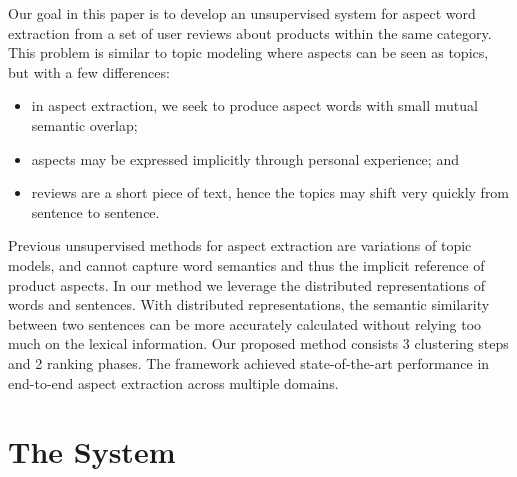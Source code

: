 \documentclass[10pt,final,conference,letterpaper]{IEEEtran}
\newcommand{\secref}[1]{Section \ref{#1}}
\begin{document}
Our goal in this paper is to develop an unsupervised system 
for aspect word extraction from a set of user reviews about products within 
the same category.  This problem is similar to topic modeling where aspects 
can be seen as topics, but with a few differences: 
\begin{itemize}
    \item in aspect extraction, we seek to produce 
	aspect words with small mutual semantic overlap; 
    \item aspects may be expressed implicitly through personal experience; and
    \item reviews are a short piece of text, 
	  hence the topics may shift very quickly from 
          sentence to sentence.
\end{itemize}
Previous unsupervised methods for aspect extraction are 
variations of topic models, and cannot capture word semantics and thus
the implicit reference of product aspects. 
In our method we leverage the distributed 
representations of words and sentences. With distributed representations, 
the semantic similarity between two sentences can be more accurately 
calculated without relying too much on the lexical information.
Our proposed method consists 3 clustering steps and
2 ranking phases. The framework achieved state-of-the-art performance 
in end-to-end aspect extraction across multiple domains.


\section{The System}
\label{sec:method}
\end{document}
